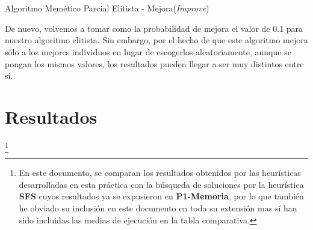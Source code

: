 \documentclass[a4paper, 11pt]{article}
\begin{document}
			\begin{algorithm}[H]
				\begin{algorithmic}[1]
				\REQUIRE \ \\
			 \
						
						\ENDIF\footnotemark
						\ENDIF
					\ENDFOR
				\ENDWHILE
					\ENDIF
				\ENDFOR
				\end{algorithmic}
			\caption{Algoritmo Memético Parcial Elitista - Mejora(\textit{Improve})}
			\label{EPMA-Improve}
			\end{algorithm}
			
			De nuevo, volvemos a tomar como la probabilidad de mejora el valor de 0.1 para nuestro
			algoritmo elitista. Sin embargo, por el hecho de que este algoritmo mejora sólo a los mejores
			individuos en lugar de escogerlos aleatoriamente, aunque se pongan los mismos valores, los
			resultados pueden llegar a ser muy distintos entre sí.
		
	\section{Resultados}\footnote{En este documento, se comparan los resultados obtenidos por las
	heurísticas desarrolladas en esta práctica con la búsqueda de soluciones por la heurística
	\textbf{SFS} cuyos resultados ya se expusieron en \textbf{P1-Memoria}, por lo que también he
	obviado su inclusión en este documento en toda su extensión mas sí han sido incluidas las medias
	de ejecución en la tabla comparativa.}
	
\end{document}
